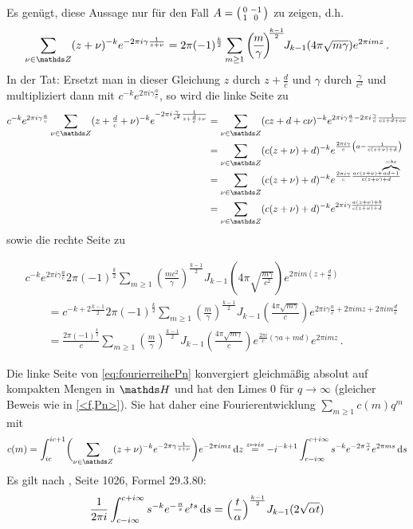 \begin{bewe}
\begin{bewe}
Es genügt, diese Aussage nur für den Fall $A = \mymat 0{-1}10$ zu zeigen, d.h.
\[
	\sum_{\nu \in \ZZ} (z + \nu)^{-k} e^{-2\pi i\gamma \frac{1}{z+\nu}} = 2\pi (-1)^{\frac k2} \sum_{m \geq 1} \left(\!\frac m\gamma\!\right)^{\!\!\frac{k-1}2} \!\! J_{k-1}(4\pi\sqrt{m\gamma}) e^{2\pi imz}
	\,.
\]
In der Tat: Ersetzt man in dieser Gleichung $z$ durch $z + \frac dc$ und $\gamma$ durch $\frac{\gamma}{c^2}$ und multipliziert dann mit $c^{-k} e^{2\pi i \gamma \frac ac}$, so wird die linke Seite zu
\begin{align*}
	c^{-k} e^{2\pi i\gamma \frac ac} \sum_{\nu \in \ZZ} (z + \tfrac dc + \nu)^{-k} e^{-2\pi i \frac{\gamma}{c^2} \frac{1}{z + \frac dc + \nu}} 
	&= \sum_{\nu \in \ZZ} (cz + d + c\nu)^{-k} e^{2\pi i\gamma \frac ac - 2\pi i \frac{\gamma}{c} \frac{1}{cz + d + c\nu}} \\
	&= \sum_{\nu \in \ZZ} (c(z + \nu) + d)^{-k} e^{\frac{2\pi i\gamma}c \left( a - \frac{1}{c(z + \nu) + d} \right)} \\[-12pt]
	&= \sum_{\nu \in \ZZ} (c(z + \nu) + d)^{-k} e^{\frac{2\pi i\gamma}c \frac{ac(z + \nu) + \overbrace{\scriptscriptstyle ad - 1}^{= bc}}{c(z + \nu) + d}} \\
	&= \sum_{\nu \in \ZZ} (c(z + \nu) + d)^{-k} e^{2\pi i\gamma \frac{a(z + \nu) + b}{c(z + \nu) + d}}
\end{align*}
sowie die rechte Seite zu

\begin{align}\label{eq:fourierreihePn}
&c^{-k} e^{2\pi i \gamma \frac ac} 2\pi (-1)^{\frac k2} \sum_{m\geq 1} \left(\!\frac {mc^2}{\gamma}\right)^{\!\!\frac {k-1}2} \!\! J_{k-1} \left(\! 4\pi \sqrt{\frac{m\gamma}{c^2}}\right) e^{2\pi i m(z + \frac dc)} \\
&\qquad = c^{-k+2\frac{k-1}2} 2\pi (-1)^{\frac k2} \sum_{m\geq 1} \left(\!\frac {m}{\gamma}\!\right)^{\!\!\frac {k-1}2} \!\! J_{k-1} \left(\! \tfrac{4\pi \sqrt{m\gamma}}c\right) e^{2\pi i \gamma \frac ac + 2\pi i mz + 2\pi im\frac dc} \nonumber \\
&\qquad = \frac{2\pi (-1)^{\frac k2}}c \sum_{m\geq 1} \left(\!\frac {m}{\gamma}\!\right)^{\!\!\frac {k-1}2} \!\! J_{k-1} \left(\! \tfrac{4\pi \sqrt{m\gamma}}c\right) e^{\frac{2\pi i}c \left(\gamma a + md\right)} e^{2\pi i mz} \nonumber
\,.
\end{align}

Die linke Seite von \eqref{eq:fourierreihePn} konvergiert gleichmäßig absolut auf kompakten Mengen in $\HH$ und hat den Limes 0 für $q\to \infty$ (gleicher Beweis wie in \autoref{<f,Pn>}).
Sie hat daher eine Fourierentwicklung $\sum_{m\geq 1} c(m) q^m$ mit
\[
c(m) = \int_{ic}^{ic+1} \biggl( \sum_{\nu \in \ZZ} (z+\nu)^{-k} e^{-2\pi \gamma \frac{1}{z+\nu}} \biggr) e^{-2\pi imz} \opd z
\stackrel{z \mapsto is}{=} -i^{-k+1} \int_{c-i \infty}^{c + i\infty} s^{-k} e^{-2\pi \frac{\gamma}{s}} e^{2\pi ms} \opd s
\]
Es gilt nach , Seite 1026, Formel 29.3.80:
\[
\frac{1}{2\pi i} \int_{c-i\infty}^{c+i\infty} s^{-k} e^{-\frac{\alpha}{s}} e^{ts} \,\mathrm{d} s = \Bigl(\frac{t}{\alpha}\Bigr)^{\frac{k-1}{2}} J_{k-1}(2\sqrt{\alpha t})
\]


\end{bewe}
\end{bewe}
